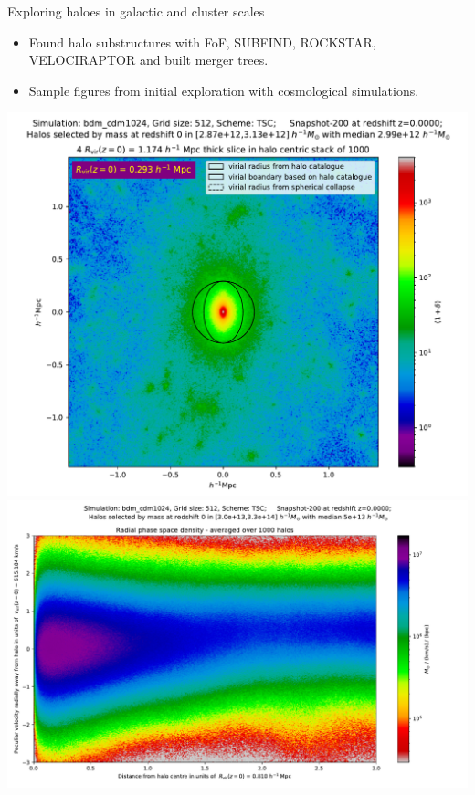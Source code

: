 \documentclass{beamer}
\begin{document}
\begin{frame}{Exploring haloes in galactic and cluster scales}
\begin{itemize}
    \item Found halo substructures with FoF, SUBFIND, ROCKSTAR, VELOCIRAPTOR and built merger trees.
    \item Sample figures from initial exploration with cosmological simulations.
\end{itemize}
    \includegraphics[width=0.485\linewidth]{figures/single_snapshot_200_1by8_3.0e+12_1000_light.pdf}
    \includegraphics[width=0.485\linewidth]{figures/phase_space_1D_200_1by8_1.0e+14_1000_light.pdf}
\end{frame}



\end{document}
